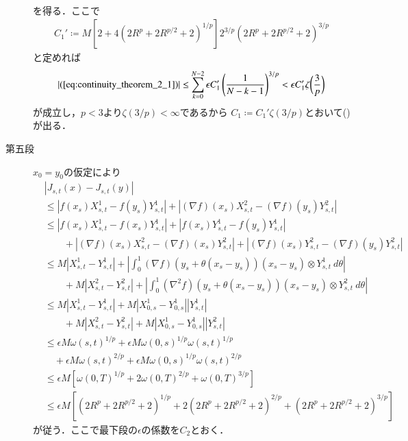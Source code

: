 \begin{prf}
\begin{description}
\begin{align}
				\end{align}
				を得る．ここで
				\begin{align}
					C_1' \coloneqq  M \left[2 + 4\left( 2 R^p + 2R^{p/2} + 2 \right)^{1/p} \right] 2^{3/p} \left( 2 R^p + 2R^{p/2} + 2 \right)^{3/p}
				\end{align}
				と定めれば
				\begin{align}
					|(\refeq{eq:continuity_theorem_2_1})| \leq
					\sum_{k=0}^{N-2} \epsilon C_1' \left( \frac{1}{N-k-1} \right)^{3/p}
					< \epsilon C_1' \zeta \biggl( \frac{3}{p} \biggr)
				\end{align}
				が成立し，$p < 3$より$\zeta(3/p) < \infty$であるから
				$C_1 \coloneqq C_1' \zeta(3/p)$とおいて()が出る．
			
			\item[第五段]
				$x_0 = y_0$の仮定により
				\begin{align}
					&\left| J_{s,t}(x) - J_{s,t}(y) \right| \\
					&\leq \left| f(x_s)X^1_{s,t} - f(y_s)Y^1_{s,t} \right| + \left| (\nabla f)(x_s)X^2_{s,t} - (\nabla f)(y_s)Y^2_{s,t} \right| \\
					&\leq \left| f(x_s)X^1_{s,t} - f(x_s)Y^1_{s,t} \right|
						+ \left| f(x_s)Y^1_{s,t} - f(y_s)Y^1_{s,t} \right| \\
						&\qquad + \left| (\nabla f)(x_s)X^2_{s,t} - (\nabla f)(x_s)Y^2_{s,t} \right|
						+ \left| (\nabla f)(x_s)Y^2_{s,t} - (\nabla f)(y_s)Y^2_{s,t} \right| \\
					&\leq M \left| X^1_{s,t} - Y^1_{s,t} \right|
						+ \left| \int_0^1 (\nabla f)(y_s + \theta(x_s - y_s))(x_s - y_s) \otimes Y^1_{s,t}\ d\theta \right| \\
						&\qquad + M \left| X^2_{s,t} - Y^2_{s,t} \right|
						+ \left| \int_0^1 (\nabla^2 f)(y_s + \theta(x_s - y_s))(x_s - y_s) \otimes Y^2_{s,t}\ d\theta \right| \\
					&\leq M \left| X^1_{s,t} - Y^1_{s,t} \right|
						+ M \left| X^1_{0,s} - Y^1_{0,s}\right| \left| Y^1_{s,t} \right| \\
						&\qquad + M \left| X^2_{s,t} - Y^2_{s,t} \right| 
						+ M \left| X^1_{0,s} - Y^1_{0,s}\right| \left| Y^2_{s,t} \right| \\
					&\leq \epsilon M \omega(s,t)^{1/p} + \epsilon M \omega(0,s)^{1/p} \omega(s,t)^{1/p} \\
						&\quad + \epsilon M \omega(s,t)^{2/p} + \epsilon M \omega(0,s)^{1/p} \omega(s,t)^{2/p} \\
					&\leq \epsilon M \left[ \omega(0,T)^{1/p} + 2\omega(0,T)^{2/p} + \omega(0,T)^{3/p} \right] \\
					&\leq \epsilon M \left[ \left( 2 R^p + 2R^{p/2} + 2 \right)^{1/p}
						+ 2\left( 2 R^p + 2R^{p/2} + 2 \right)^{2/p}
						+\left( 2 R^p + 2R^{p/2} + 2 \right)^{3/p} \right]
				\end{align}
				が従う．ここで最下段の$\epsilon$の係数を$C_2$とおく．
				

\end{description}
\end{prf}
